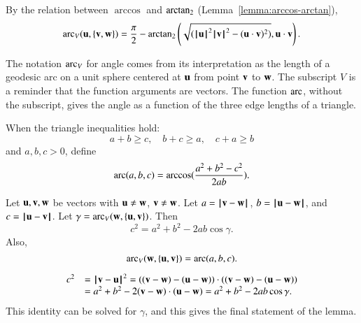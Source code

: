 By the relation between $\arccos$ and $\atn$
(Lemma~\ref{lemma:arccos-arctan}), %
    \begin{equation}\label{eqn:angle}
    \arc_V(\u,\{\v,\w\}) = \frac{\pi}2 - \atn\left ({\sqrt{(\normo{\u}^2\normo{\v}^2 -
    (\u\cdot \v)^2)}}, {\u\cdot \v}\right).
    \end{equation}
%

The notation $\arc_V$ for angle comes from its interpretation as the
length of a geodesic arc on a unit sphere
centered at $\u$ from point $\v$ to $\w$.
%
The subscript $V$ is a reminder that
the function arguments are vectors.  The function
$\arc$, without the subscript,  gives the angle as a function
of the three edge lengths of a triangle.
%
%
%


\begin{definition}[arc]
When the triangle inequalities hold:
$$
a + b \ge c,\quad b + c \ge a, \quad c+a \ge b
$$
and $a,b,c >0$, define
 $$\arc(a,b,c) = \arccos(\frac{a^2 + b^2 - c^2}{2 a b}).$$
%
\end{definition}

\begin{lemma}
Let $\u,\v,\w$ be vectors with $\u\ne \w$, $\v\ne \w$.  Let $a
    = \norm{\v }{ \w}$, $b = \norm{\u }{ \w}$, and $c = \norm{\u }{ \v}$.
    Let $\gamma=\arc_V(\w,\{\u,\v\})$.    Then
        $$c^2 = a^2 + b^2 - 2 a b \cos\gamma.$$
Also,
$$
\arc_V(\w,\{\u,\v\})= \arc(a,b,c).
$$

\end{lemma}
%
%
%
%
\begin{proved}
    $$\begin{array}{lll}c^2 &= \norm{\v }{ \u}^2 = ((\v - \w) - (\u - \w))\cdot ((\v - \w) - (\u -
    \w)) \\ &= a^2 + b^2 - 2 (\v - \w)\cdot (\u - \w) = a^2 +b ^2 - 2 a b
    \cos\gamma.
    \end{array}$$
This identity can be solved for $\gamma$, and this gives the final statement of the lemma.
\swallowed\end{proved}


